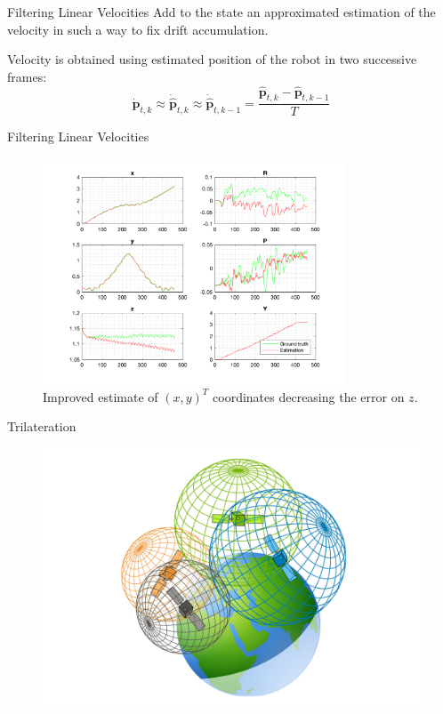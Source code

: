 \documentclass[10pt]{beamer}
\begin{document}
    \begin{frame}[fragile]{Filtering Linear Velocities}
        Add to the state an approximated estimation of the velocity in such a way to fix drift accumulation.

        Velocity is obtained using estimated position of the robot in two \mbox{successive} frames:
        \begin{equation*}
            \bm{\dot{p}}_{t,k} \approx \bm{\dot{\hat{p}}}_{t,k} \approx \bm{\dot{\hat{p}}}_{t,k-1}
            = \frac{\bm{\hat{p}}_{t,k} - \bm{\hat{p}}_{t,k-1}}{T}
        \end{equation*}
    \end{frame}

    \begin{frame}[fragile]{Filtering Linear Velocities}
        \begin{figure}
        \caption{Improved estimate of $(x, y)^{T}$ coordinates decreasing the error on $z$.}
        \vspace{-0.3cm}
        \includegraphics[width=0.8\textwidth]{images/accelerometer_prev_linearvelocity.png}
    \end{figure}

    \end{frame}

    \begin{frame}{Trilateration}
        \begin{figure}
            \includegraphics[width=\textwidth]{images/GPS-Trilateration.png}
        \end{figure}
    \end{frame}
\end{document}

